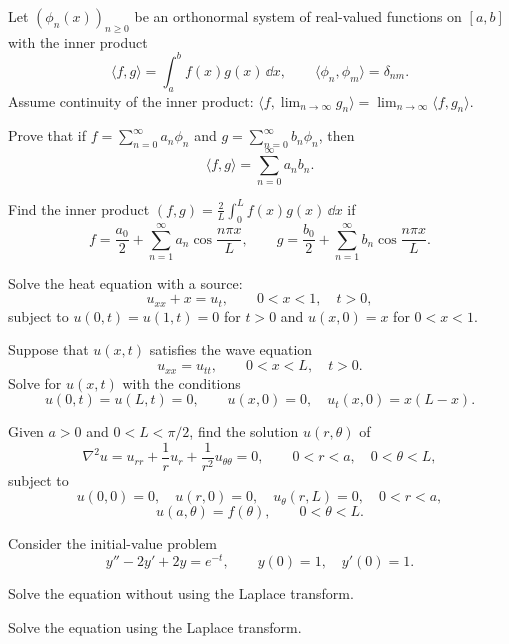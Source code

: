 \documentclass[11pt,oneside]{article}
\begin{document}
\begin{problem}
Let $(\phi_n(x))_{n\ge0}$ be an orthonormal system of real-valued functions on $[a,b]$ with the inner product
\[\langle f,g\rangle=\int_a^b f(x)g(x)\,\dd x,\qquad\langle\phi_n,\phi_m\rangle=\delta_{nm}.\]
Assume continuity of the inner product: ${\langle f,\lim_{n\to\infty}g_n\rangle}=\lim_{n\to\infty}\langle f,g_n\rangle$.
\begin{problemsubparts}
\item Prove that if $f=\sum_{n=0}^{\infty}a_n\phi_n$ and $g=\sum_{n=0}^{\infty}b_n\phi_n$, then
\[\langle f,g\rangle=\sum_{n=0}^{\infty}a_nb_n.\]
\item Find the inner product $\displaystyle(f,g)=\frac2L\int_0^L f(x)g(x)\,\dd x$ if
\[f=\frac{a_0}{2}+\sum_{n=1}^{\infty}a_n\cos\frac{n\pi x}{L},\qquad g=\frac{b_0}{2}+\sum_{n=1}^{\infty}b_n\cos\frac{n\pi x}{L}.\]
\end{problemsubparts}
\end{problem}

\begin{problem}
Solve the heat equation with a source:
\[u_{xx}+x=u_t,\qquad 0<x<1,\quad t>0,\]
subject to $u(0,t)=u(1,t)=0$ for $t>0$ and $u(x,0)=x$ for $0<x<1$.
\end{problem}

\begin{problem}
Suppose that $u(x,t)$ satisfies the wave equation
\[u_{xx}=u_{tt},\qquad 0<x<L,\quad t>0.\]
Solve for $u(x,t)$ with the conditions
\[u(0,t)=u(L,t)=0,\qquad u(x,0)=0,\quad u_t(x,0)=x(L-x).\]
\end{problem}

\begin{problem}
Given $a>0$ and $0<L<\pi/2$, find the solution $u(r,\theta)$ of
\[\nabla^2u=u_{rr}+\frac1r u_r+\frac1{r^2}u_{\theta\theta}=0,\qquad 0<r<a,\quad 0<\theta<L,\]
subject to
\[u(0,0)=0,\quad u(r,0)=0,\quad u_\theta(r,L)=0,\quad 0<r<a,\]
\[u(a,\theta)=f(\theta),\qquad 0<\theta<L.\]
\end{problem}

\begin{problem}
Consider the initial-value problem
\[y''-2y'+2y=e^{-t},\qquad y(0)=1,\quad y'(0)=1.\]
\begin{problemsubparts}
\item Solve the equation without using the Laplace transform.
\item Solve the equation using the Laplace transform.
\end{problemsubparts}
\end{problem}
\end{document}
